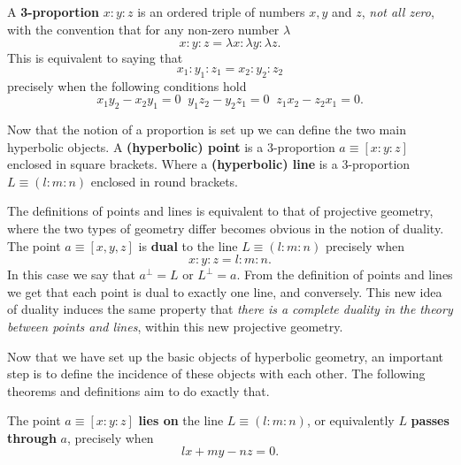 \documentclass{unswthesis}
\begin{document}
\pagebreak A \textbf{3-proportion} $x:y:z$ is an ordered triple of numbers $%
x,y$ and $z$, \textit{not all zero}, with the convention that for any
non-zero number $\lambda$ 
\begin{equation*}
x:y:z=\lambda x:\lambda y:\lambda z. 
\end{equation*}
This is equivalent to saying that 
\begin{equation*}
x_{1}:y_{1}:z_{1}=x_{2}:y_{2}:z_{2} 
\end{equation*}
precisely when the following conditions hold 
\begin{equation}  \label{proportionequal}
x_{1}y_{2}-x_{2}y_{1}=0\;\;y_{1}z_{2}-y_{2}z_{1}=0\;%
\;z_{1}x_{2}-z_{2}x_{1}=0.
\end{equation}

Now that the notion of a proportion is set up we can define the two main
hyperbolic objects. A \textbf{(hyperbolic) point} is a 3-proportion $a\equiv[%
x:y:z]$ enclosed in square brackets. Where a \textbf{(hyperbolic) line} is a
3-proportion $L\equiv(l:m:n)$ enclosed in round brackets.\newline

The definitions of points and lines is equivalent to that of projective
geometry, where the two types of geometry differ becomes obvious in the
notion of duality. The point $a\equiv[x,y,z]$ is \textbf{dual} to the line $%
L\equiv(l:m:n)$ precisely when 
\begin{equation*}
x:y:z=l:m:n. 
\end{equation*}
In this case we say that $a^{\perp}=L$ or $L^{\perp}=a$.\newline
From the definition of points and lines we get that each point is dual to
exactly one line, and conversely. This new idea of duality induces the same
property that \textit{there is a complete duality in the theory between
points and lines}, within this new projective geometry.\newline

Now that we have set up the basic objects of hyperbolic geometry, an
important step is to define the incidence of these objects with each other.
The following theorems and definitions aim to do exactly that.\newline

The point $a\equiv[x:y:z]$ \textbf{lies on} the line $L\equiv(l:m:n)$, or
equivalently $L$ \textbf{passes through} $a$, precisely when 
\begin{equation*}
lx+my-nz=0. 
\end{equation*}%
\newline
\end{document}
